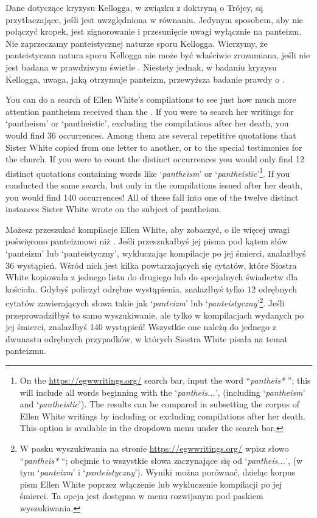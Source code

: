 Dane dotyczące kryzysu Kellogga, w związku z doktryną o Trójcy, są przytłaczające, jeśli  jest uwzględniona w równaniu. Jedynym sposobem, aby nie połączyć kropek, jest zignorowanie  i przesunięcie uwagi wyłącznie na panteizm. Nie zaprzeczamy panteistycznej naturze sporu Kellogga. Wierzymy, że panteistyczna natura sporu Kellogga nie może być właściwie zrozumiana, jeśli nie jest badana w prawdziwym świetle . Niestety jednak, w badaniu kryzysu Kellogga, uwaga, jaką otrzymuje panteizm, przewyższa badanie prawdy o .


You can do a search of Ellen White’s compilations to see just how much more attention pantheism received than the . If you were to search her writings for ‘pantheism’ or ‘pantheistic’, excluding the compilations after her death, you would find 36 occurrences. Among them are several repetitive quotations that Sister White copied from one letter to another, or to the special testimonies for the church. If you were to count the distinct occurrences you would only find 12 distinct quotations containing words like ‘\textit{pantheism}’ or ‘\textit{pantheistic}’\footnote{On the \href{https://egwwritings.org/}{https://egwwritings.org/} search bar, input the word “\textit{pantheis*} ”; this will include all words beginning with the ‘\textit{pantheis...}’, (including ‘\textit{pantheism}’ and ‘\textit{pantheistic}’). The results can be compared in subsetting the corpus of Ellen White writings by including or excluding compilations after her death. This option is available in the dropdown menu under the search bar.}. If you conducted the same search, but only in the compilations issued after her death, you would find 140 occurrences! All of these fall into one of the twelve distinct instances Sister White wrote on the subject of pantheism.


Możesz przeszukać kompilacje Ellen White, aby zobaczyć, o ile więcej uwagi poświęcono panteizmowi niż . Jeśli przeszukałbyś jej pisma pod kątem słów ‘panteizm’ lub ‘panteistyczny’, wykluczając kompilacje po jej śmierci, znalazłbyś 36 wystąpień. Wśród nich jest kilka powtarzających się cytatów, które Siostra White kopiowała z jednego listu do drugiego lub do specjalnych świadectw dla kościoła. Gdybyś policzył odrębne wystąpienia, znalazłbyś tylko 12 odrębnych cytatów zawierających słowa takie jak ‘\textit{panteizm}’ lub ‘\textit{panteistyczny}’\footnote{W pasku wyszukiwania na stronie \href{https://egwwritings.org/}{https://egwwritings.org/} wpisz słowo “\textit{pantheis*} “; obejmie to wszystkie słowa zaczynające się od ‘\textit{pantheis...}’, (w tym ‘\textit{panteizm}’ i ‘\textit{panteistyczny}’). Wyniki można porównać, dzieląc korpus pism Ellen White poprzez włączenie lub wykluczenie kompilacji po jej śmierci. Ta opcja jest dostępna w menu rozwijanym pod paskiem wyszukiwania.}. Jeśli przeprowadziłbyś to samo wyszukiwanie, ale tylko w kompilacjach wydanych po jej śmierci, znalazłbyś 140 wystąpień! Wszystkie one należą do jednego z dwunastu odrębnych przypadków, w których Siostra White pisała na temat panteizmu.


